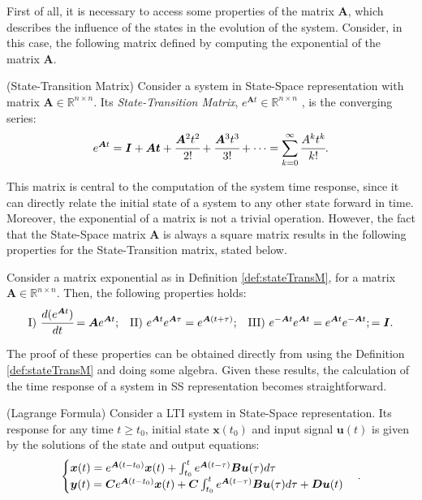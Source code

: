\documentclass[a4paper,11pt]{book}
\numberwithin{figure}{chapter}
\numberwithin{equation}{chapter}
\numberwithin{table}{chapter}
\newtheorem{theorem}{Theorem}[chapter]
\theoremstyle{definition}
\newtheorem{definition}{Definition}[chapter]
\newcounter{boxed-theorem}
\newenvironment{boxed-theorem}[1]
{\colorlet{shadecolor}{pastelBlue2!5} \begin{shaded} \begin{theorem}{#1}}
{\end{theorem} \end{shaded}}
\newcounter{boxed-lemma}
\newcounter{boxed-definition}
\newenvironment{boxed-definition}[1]
{\colorlet{shadecolor}{pastelYellow!15} \begin{shaded} \begin{definition}{#1}}
{\end{definition} \end{shaded}}
\newcounter{boxed-example}
\begin{document}
First of all, it is necessary to access some properties of the matrix $\bm{A}$, which describes the influence of the states in the evolution of the system. Consider, in this case, the following matrix defined by computing the exponential of the matrix $\bm{A}$. 	

\begin{boxed-definition}{(State-Transition Matrix)} \label{def:stateTransM}
    Consider a system in State-Space representation with matrix $\bm{A} \in \mathbb{R}^{n \times n}$. Its \textit{State-Transition Matrix}, $e^{\bm{A} t} \in \mathbb{R}^{n \times n}$ , is the converging series:
\begin{equation}
    e^{\bm{A} t} = \bm{I} + \bm{At} + \cfrac{\bm{A}^2 t^2}{2!} + \cfrac{\bm{A}^3 t^3}{3!} + \cdots = \sum_{k=0}^{\infty} \cfrac{A^k t^k}{k!}
.\end{equation} 
\end{boxed-definition}

This matrix is central to the computation of the system time response, since it can directly relate the initial state of a system to any other state forward in time. Moreover, the exponential of a matrix is not a trivial operation. However, the fact that the State-Space matrix $\bm{A}$ is always a square matrix results in the following properties for the State-Transition matrix, stated below.

\begin{boxed-theorem}{} \label{th:stateTransMProp}
    Consider a matrix exponential as in Definition \ref{def:stateTransM}, for a matrix $\bm{A}  \in \mathbb{R}^{n \times n}$. Then, the following properties holds:
\begin{align}
        {\rm I})\ \cfrac{d ( e^{\bm{A} t} )}{dt} = \bm{A} e^{\bm{A} t}; & &
        {\rm II})\ e^{\bm{A} t} e^{\bm{A} \tau} = e^{\bm{A} (t + \tau)}; & &
        {\rm III})\ e^{-\bm{A} t} e^{\bm{A} t} = e^{\bm{A} t} e^{-\bm{A} t}; = \bm{I}
.\end{align}
\end{boxed-theorem}

The proof of these properties can be obtained directly from using the Definition \ref{def:stateTransM} and doing some algebra. Given these results, the calculation of the time response of a system in SS representation becomes straightforward.

\begin{boxed-theorem}{(Lagrange Formula)} \label{th:lagrangeForm}
    Consider a LTI system in State-Space representation. Its response for any time $t \geq t_0$, initial state $\bm{x}(t_0)$ and input signal $\bm{u}(t)$ is given by the solutions of the state and output equations:
    \begin{align}
    \begin{cases}
        \bm{x}(t) = e^{\bm{A}(t - t_0)} \bm{x}(t) + \int_{t_0}^{t} e^{\bm{A}(t - \tau)} \bm{B} \bm{u}(\tau) d \tau \hfill & \\
        \bm{y}(t) = \bm{C} e^{\bm{A}(t - t_0)} \bm{x}(t) + \bm{C} \int_{t_0}^{t} e^{\bm{A}(t - \tau)} \bm{B} \bm{u}(\tau) d \tau + \bm{D} \bm{u}(t) &
    \end{cases}
    .\end{align}
\end{boxed-theorem}
\end{document}
